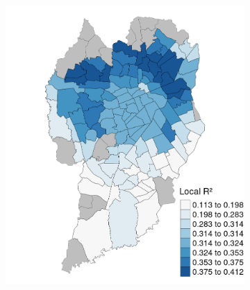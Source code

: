 

\begin{figure}[!htbp]
    \centering\footnotesize
    \captionsetup{font=footnotesize}
    \caption{GW LOCAL $R^2$}
    \begin{subfigure}{0.5\textwidth}
        \includegraphics{fig/r2_map.png}
    \end{subfigure}%
    \begin{subfigure}{0.5\textwidth}

\end{subfigure}
\end{figure}
